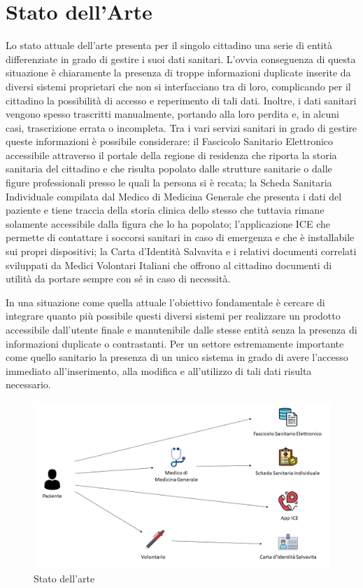 \documentclass[12pt,a4paper,twoside,openright,titlepage]{book}
\begin{document}
\section{Stato dell'Arte}
Lo stato attuale dell'arte presenta per il singolo cittadino una serie di entità differenziate in grado di gestire i suoi dati sanitari. L'ovvia conseguenza di questa situazione è chiaramente la presenza di troppe informazioni duplicate inserite da diversi sistemi proprietari che non si interfacciano tra di loro, complicando per il cittadino la possibilità di accesso e reperimento di tali dati. Inoltre, i dati sanitari vengono spesso trascritti manualmente, portando alla loro perdita e, in alcuni casi, trascrizione errata o incompleta.\newline
Tra i vari servizi sanitari in grado di gestire queste informazioni è possibile considerare: il Fascicolo Sanitario Elettronico accessibile attraverso il portale della regione di residenza che riporta la storia sanitaria del cittadino e che risulta popolato dalle strutture sanitarie o dalle figure professionali presso le quali la persona si è recata; la Scheda Sanitaria Individuale compilata dal Medico di Medicina Generale che presenta i dati del paziente e tiene traccia della storia clinica dello stesso che tuttavia rimane solamente accessibile dalla figura che lo ha popolato; l'applicazione ICE che permette di contattare i soccorsi sanitari in caso di emergenza e che è installabile sui propri dispositivi; la Carta d'Identità Salvavita e i relativi documenti correlati sviluppati da Medici Volontari Italiani che offrono al cittadino documenti di utilità da portare sempre con sé in caso di necessità.\newline

In una situazione come quella attuale l'obiettivo fondamentale è cercare di integrare quanto più possibile questi diversi sistemi per realizzare un prodotto accessibile dall'utente finale e manutenibile dalle stesse entità senza la presenza di informazioni duplicate o contrastanti. Per un settore estremamente importante come quello sanitario la presenza di un unico sistema in grado di avere l'accesso immediato all'inserimento, alla modifica e all'utilizzo di tali dati risulta necessario.

\begin{figure}[H]
\centering
\includegraphics[scale = 0.4]{statoarte}
\caption{Stato dell'arte}
\end{figure}
\end{document}
